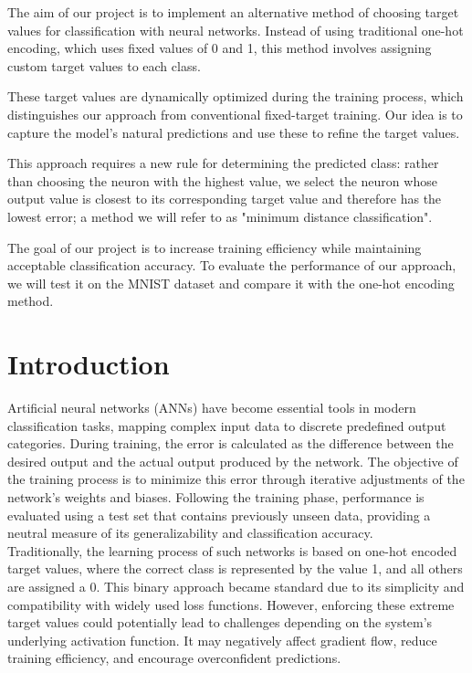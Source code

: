 \documentclass[12pt,fleqn,a4paper]{article}
\begin{document}
\abstract{}
The aim of our project is to implement an alternative method of choosing target values for classification with neural networks.  Instead of using traditional one-hot encoding, which uses fixed values of 0 and 1, this method involves assigning custom target values to each class. 

These target values are dynamically optimized during the training process, which distinguishes our approach from conventional fixed-target training. Our idea is to capture the model's natural predictions and use these to refine the target values.

This approach requires a new rule for determining the predicted class: rather than choosing the neuron with the highest value, we select the neuron whose output value is closest to its corresponding target value and therefore has the lowest error; a method we will refer to as "minimum distance classification".

The goal of our project is to increase training efficiency while maintaining acceptable classification accuracy. To evaluate the performance of our approach, we will test it on the MNIST dataset and compare it with the one-hot encoding method.

\vspace{4em}

\section{Introduction}
Artificial neural networks (ANNs) have become essential tools in modern classification tasks, mapping complex input data to discrete predefined output categories. During training, the error is calculated as the difference between the desired output and the actual output produced by the network. The objective of the training process is to minimize this error through iterative adjustments of the network's weights and biases. Following the training phase, performance is evaluated using a test set that contains previously unseen data, providing a neutral measure of its generalizability and classification accuracy. \\

Traditionally, the learning process of such networks is based on one-hot encoded target values, where the correct class is represented by the value 1, and all others are assigned a 0. This binary approach became standard due to its simplicity and compatibility with widely used loss functions. However, enforcing these extreme target values could potentially lead to challenges depending on the system's underlying activation function. It may negatively affect gradient flow, reduce training efficiency, and encourage overconfident predictions.\\
\end{document}
